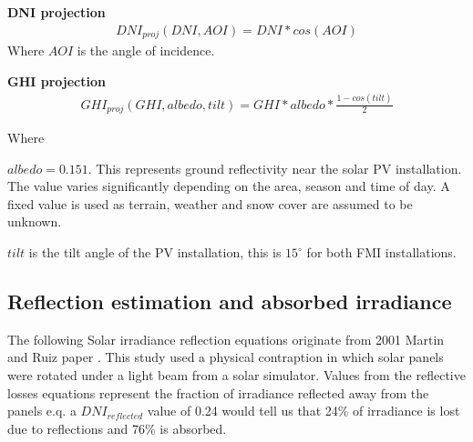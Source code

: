 

\noindent\textbf{DNI projection}\cite{sandia_poa_dni}
%
\begin{equation}
\begin{split}
\label{sandia_eq_dni}
DNI_{proj}(DNI, AOI)= DNI*cos(AOI)
\end{split}
\end{equation}
Where $AOI$ is the angle of incidence.


\noindent\textbf{GHI projection}\cite{sandia_poa_ghi}
%
\begin{equation}
\begin{split}
\label{sandia_eq_ghi}
GHI_{proj}(GHI, albedo, tilt)= GHI*albedo*\frac{1-cos(tilt)}{2}
\end{split}
\end{equation}

\noindent Where 

$albedo = 0.151$. This represents ground reflectivity near the solar PV installation. The value varies significantly depending on the area, season and time of day. A fixed value is used as terrain, weather and snow cover are assumed to be unknown.

$tilt$ is the tilt angle of the PV installation, this is $15^\circ$ for both FMI installations.


\newpage
\subsection{Reflection estimation and absorbed irradiance}
The following Solar irradiance reflection equations originate from 2001 Martin and Ruiz paper \cite{solar_reflections}. This study used a physical contraption in which solar panels were rotated under a light beam from a solar simulator. Values from the reflective losses equations represent the fraction of irradiance reflected away from the panels e.q. a $DNI_{reflected}$ value of 0.24 would tell us that 24\% of irradiance is lost due to reflections and 76\% is absorbed. 

